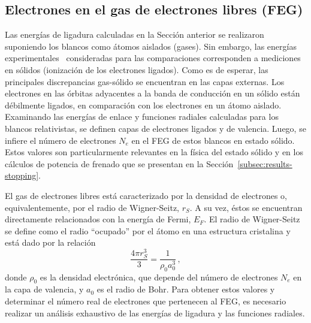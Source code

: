 \subsection{Electrones en el gas de electrones libres (FEG)}
\label{subsec:FEG}

Las energías de ligadura calculadas en la Sección anterior se realizaron 
suponiendo los blancos como átomos aislados (gases). Sin embargo, las 
energías experimentales~\cite{Williams:95} consideradas para las 
comparaciones corresponden a mediciones en sólidos (ionización de los 
electrones ligados). Como es de esperar, las principales discrepancias 
gas-sólido se encuentran en las capas externas. Los electrones en las 
órbitas adyacentes a la banda de conducción en un sólido están 
débilmente ligados, en comparación con los electrones en un átomo 
aislado. Examinando las energías de enlace y funciones radiales 
calculadas para los blancos relativistas, se definen capas de electrones 
ligados y de valencia. Luego, se infiere el número de electrones $N_e$ 
en el FEG de estos blancos en estado sólido. Estos valores son 
particularmente relevantes en la física del estado sólido y en los 
cálculos de potencia de frenado que se presentan en la 
Sección~\ref{subsec:results-stopping}.

El gas de electrones libres está caracterizado por la densidad de 
electrones o, equivalentemente, por el radio de Wigner-Seitz, $r_S$. A 
su vez, éstos se encuentran directamente relacionados con la energía de 
Fermi, $E_F$. El radio de Wigner-Seitz se define como el radio 
``ocupado'' por el átomo en una estructura cristalina y está dado por la 
relación
\begin{equation}
\frac{4\pi r_S^3}{3}=\frac{1}{\rho_0 a_0^3}\,,
\end{equation} 
donde $\rho_0$ es la densidad electrónica, que depende del número de 
electrones $N_e$ en la capa de valencia, y $a_0$ es el radio de Bohr. 
Para obtener estos valores y determinar el número real de electrones que 
pertenecen al FEG, es necesario realizar un análisis exhaustivo de las 
energías de ligadura y las funciones radiales.

